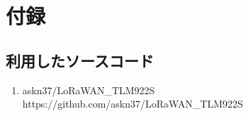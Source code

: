 \chapter*{付録}	%
\thispagestyle{plain}   %

\section{利用したソースコード}
\begin{enumerate}
    \item askn37/LoRaWAN\_TLM922S https://github.com/askn37/LoRaWAN\_TLM922S
\end{enumerate}
